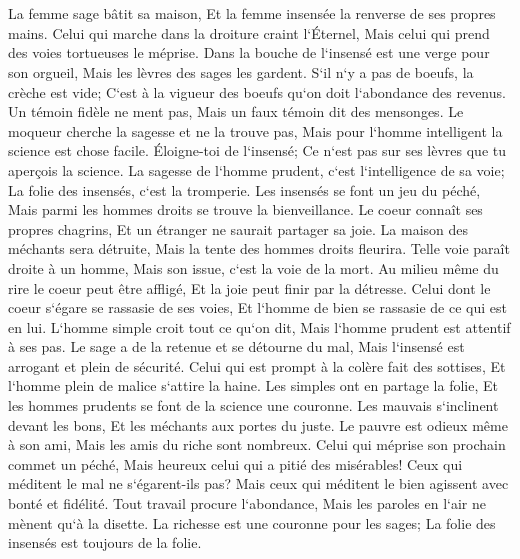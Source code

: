 \chapter{}

\verse La femme sage bâtit sa maison, Et la femme insensée la renverse de ses propres mains. 
\verse Celui qui marche dans la droiture craint l`Éternel, Mais celui qui prend des voies tortueuses le méprise. 
\verse Dans la bouche de l`insensé est une verge pour son orgueil, Mais les lèvres des sages les gardent. 
\verse S`il n`y a pas de boeufs, la crèche est vide; C`est à la vigueur des boeufs qu`on doit l`abondance des revenus. 
\verse Un témoin fidèle ne ment pas, Mais un faux témoin dit des mensonges. 
\verse Le moqueur cherche la sagesse et ne la trouve pas, Mais pour l`homme intelligent la science est chose facile. 
\verse Éloigne-toi de l`insensé; Ce n`est pas sur ses lèvres que tu aperçois la science. 
\verse La sagesse de l`homme prudent, c`est l`intelligence de sa voie; La folie des insensés, c`est la tromperie. 
\verse Les insensés se font un jeu du péché, Mais parmi les hommes droits se trouve la bienveillance. 
\verse Le coeur connaît ses propres chagrins, Et un étranger ne saurait partager sa joie. 
\verse La maison des méchants sera détruite, Mais la tente des hommes droits fleurira. 
\verse Telle voie paraît droite à un homme, Mais son issue, c`est la voie de la mort. 
\verse Au milieu même du rire le coeur peut être affligé, Et la joie peut finir par la détresse. 
\verse Celui dont le coeur s`égare se rassasie de ses voies, Et l`homme de bien se rassasie de ce qui est en lui. 
\verse L`homme simple croit tout ce qu`on dit, Mais l`homme prudent est attentif à ses pas. 
\verse Le sage a de la retenue et se détourne du mal, Mais l`insensé est arrogant et plein de sécurité. 
\verse Celui qui est prompt à la colère fait des sottises, Et l`homme plein de malice s`attire la haine. 
\verse Les simples ont en partage la folie, Et les hommes prudents se font de la science une couronne. 
\verse Les mauvais s`inclinent devant les bons, Et les méchants aux portes du juste. 
\verse Le pauvre est odieux même à son ami, Mais les amis du riche sont nombreux. 
\verse Celui qui méprise son prochain commet un péché, Mais heureux celui qui a pitié des misérables! 
\verse Ceux qui méditent le mal ne s`égarent-ils pas? Mais ceux qui méditent le bien agissent avec bonté et fidélité. 
\verse Tout travail procure l`abondance, Mais les paroles en l`air ne mènent qu`à la disette. 
\verse La richesse est une couronne pour les sages; La folie des insensés est toujours de la folie. 
